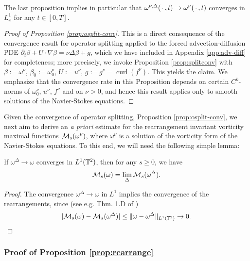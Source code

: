 \documentclass[reqno,12pt]{amsart}
\DeclareMathOperator{\curl}{curl}
\begin{document}
  \begin{remark}
  The last proposition implies in particular that $\omega^{\nu,\Delta}({\,\cdot\,},t) \to \omega^\nu({\,\cdot\,},t)$ converges in $L^1_x$ for any $t \in [0,T]$.
  \end{remark}

  \begin{proof}[Proof of Proposition \ref{prop:osplit-conv}]
    This is a direct consequence of the convergence result for operator splitting applied to the forced advection-diffusion PDE $\partial_t \beta + U\cdot \nabla \beta = \nu \Delta \beta + g$, which we have included in Appendix \ref{app:adv-diff} for completeness; more precisely, we invoke Proposition \ref{prop:splitconv} with $\beta := \omega^\nu$, $\beta_0 := \omega^\nu_0$, $U := u^\nu$, $g := g^\nu = \curl(f^\nu)$. This yields the claim. We emphasize that the convergence rate in this Proposition depends on certain $C^k$-norms of $\omega_0^\nu$, $u^\nu$, $f^\nu$ and on $\nu > 0$, and hence this result applies only to smooth solutions of the Navier-Stokes equations.
  \end{proof}


Given the convergence of operator splitting, Proposition \ref{prop:osplit-conv}, we next aim to derive an {\it a priori} estimate for the rearrangement invariant vorticity maximal functions $\mathcal{M}_s(\omega^\nu)$, where $\omega^\nu$  is a solution of the vorticity form of the Navier-Stokes equations. To this end, we will need the following simple lemma:

\begin{lemma}
\label{lem:rearrconv}
  If $\omega^\Delta \to \omega$ converges in $L^1(\mathbb{T}^2)$, then for any $s \ge 0$, we have
  \[
  \mathcal{M}_s( \omega )
  =
  \lim_{\Delta} \mathcal{M}_s (\omega^\Delta).
  \]
\end{lemma}

\begin{proof}
The convergence $\omega^\Delta \to \omega$ in $L^1$ implies the convergence of the rearrangements, since (see e.g. Thm. 1.D of \cite{talenti})
\[
|\mathcal{M}_s(\omega) - \mathcal{M}_s(\omega^\Delta)|
\le
\Vert \omega - \omega^\Delta \Vert_{L^1(\mathbb{T}^2)} \to 0.
\]
\end{proof}


\subsubsection{Proof of Proposition \ref{prop:rearrange}}
\label{sec:pf-rearrange}
\end{document}
